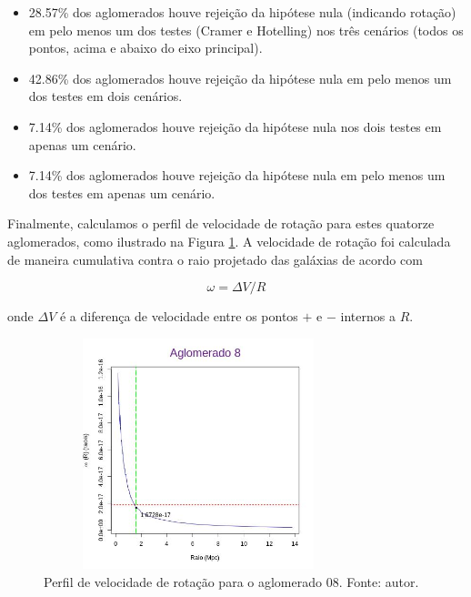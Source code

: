 \begin{itemize}
   	\item 28.57\% dos aglomerados houve rejeição da hipótese nula (indicando rotação) em pelo menos um dos testes (Cramer e Hotelling) nos três cenários (todos os pontos, acima e abaixo do eixo principal). 
   	\item 42.86\% dos aglomerados houve rejeição da hipótese nula em pelo menos um dos testes em dois cenários.
   	\item 7.14\% dos aglomerados houve rejeição da hipótese nula nos dois testes em apenas um cenário.
   	\item 7.14\% dos aglomerados houve rejeição da hipótese nula em pelo menos um dos testes em apenas um cenário.
 \end{itemize} 

Finalmente, calculamos o perfil de velocidade de rotação para estes quatorze aglomerados, como ilustrado na Figura \ref{selec20rotacao}. A velocidade de rotação foi calculada de maneira cumulativa contra o raio projetado das galáxias de acordo com

\begin{equation}
\omega= \Delta V/R
\label{eq:eq10}
\end{equation}

\noindent onde $\Delta V$ é a diferença de velocidade entre os pontos $+$ e $-$ internos a $R$.

\begin{figure}[!htbp] %
\vspace{-2pt}
\begin{center}
\includegraphics[height=6.7cm,width=9cm]{04-figuras/selec20rotacao}%
\caption{Perfil de velocidade de rotação para o aglomerado 08. Fonte: autor.}
\label{selec20rotacao}%
\end{center}
\end{figure}

